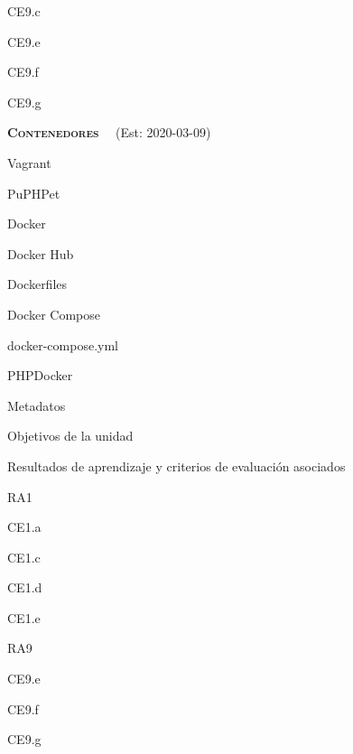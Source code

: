 \begin{longenum}
\begin{longenum}
\begin{longenum}
\begin{longenum}
                \begin{longenum}
                    \item CE9.c
                    \item CE9.e
                    \item CE9.f
                    \item CE9.g
                \end{longenum}
            \end{longenum}
        \end{longenum}
    \end{longenum}
    \item \textbf{\textsc{Contenedores}} \ \opcional\ (Est: 2020-03-09)
    \begin{longenum}
        \item Vagrant
        \begin{longenum}
            \item PuPHPet
        \end{longenum}
        \item Docker
        \begin{longenum}
            \item Docker Hub
            \item Dockerfiles
            \item Docker Compose
            \begin{longenum}
                \item docker-compose.yml
            \end{longenum}
        \end{longenum}
        \item PHPDocker
        \item Metadatos
        \begin{longenum}
            \item Objetivos de la unidad
            \item Resultados de aprendizaje y criterios de evaluación asociados
            \begin{longenum}
                \item RA1
                \begin{longenum}
                    \item CE1.a
                    \item CE1.c
                    \item CE1.d
                    \item CE1.e
                \end{longenum}
                \item RA9
                \begin{longenum}
                    \item CE9.e
                    \item CE9.f
                    \item CE9.g
                \end{longenum}
            \end{longenum}
        \end{longenum}
    \end{longenum}
\end{longenum}
